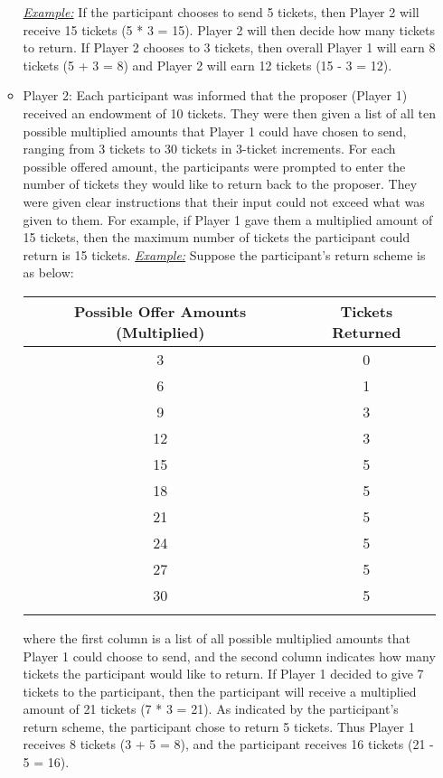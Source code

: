 \documentclass[12pt]{article}
\begin{document}
\begin{itemize}
\begin{itemize}
		\subitem \underline{\textit{Example:}} If the participant chooses to send 5 tickets, then Player 2 will receive 15 tickets (5 * 3 = 15). Player 2 will then decide how many tickets to return. If Player 2 chooses to 3 tickets, then overall Player 1 will earn 8 tickets (5 + 3 = 8) and Player 2 will earn 12 tickets (15 - 3 = 12).
		\item{Player 2}: Each participant was informed that the proposer (Player 1) received an endowment of 10 tickets. They were then given a list of all ten possible multiplied amounts that Player 1 could have chosen to send, ranging from 3 tickets to 30 tickets in 3-ticket increments. For each possible offered amount, the participants were prompted to enter the number of tickets they would like to return back to the proposer. They were given clear instructions that their input could not exceed what was given to them. For example, if Player 1 gave them a multiplied amount of 15 tickets, then the maximum number of tickets the participant could return is 15 tickets.
		\subitem \underline{\textit{Example:}} Suppose the participant\rq s return scheme is as below: \\
		
\begin{center}
\begin{tabular}{ c c }
\hline \hline
 Possible Offer Amounts (Multiplied) & Tickets Returned \\ 
 \hline
3 & 0  \\  
6 & 1 \\  
9 & 3  \\  
12 & 3  \\  
15 & 5   \\  
18 & 5  \\  
21 & 5 \\  
24 & 5 \\  
27 & 5 \\  
30 & 5 \\  
\hline \hline \\
\end{tabular}
\end{center} 

	where the first column is a list of all possible multiplied amounts that Player 1 could choose to send, and the second column indicates how many tickets the participant would like to return. If Player 1 decided to give 7 tickets to the participant, then the participant will receive a multiplied amount of 21 tickets (7 * 3 = 21). As indicated by the participant\rq s return scheme, the participant chose to return 5 tickets. Thus Player 1 receives 8 tickets (3 + 5 =  8), and the participant receives 16 tickets (21 - 5 = 16).
	\end{itemize}
	

\end{itemize}
\end{document}
